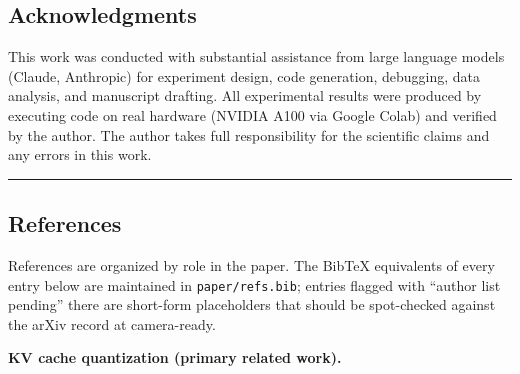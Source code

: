 \subsection{Acknowledgments}\label{acknowledgments}

This work was conducted with substantial assistance from large language
models (Claude, Anthropic) for experiment design, code generation,
debugging, data analysis, and manuscript drafting. All experimental
results were produced by executing code on real hardware (NVIDIA A100
via Google Colab) and verified by the author. The author takes full
responsibility for the scientific claims and any errors in this work.

\begin{center}\rule{0.5\linewidth}{0.5pt}\end{center}

\subsection{References}\label{references}

References are organized by role in the paper. The BibTeX equivalents of
every entry below are maintained in \texttt{paper/refs.bib}; entries
flagged with ``author list pending'' there are short-form placeholders
that should be spot-checked against the arXiv record at camera-ready.

\textbf{KV cache quantization (primary related work).}

